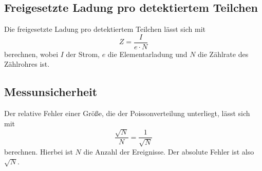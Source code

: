 \subsection{Freigesetzte Ladung pro detektiertem Teilchen}
Die freigesetzte Ladung pro detektiertem Teilchen lässt sich mit
\begin{equation}\label{eq:Z}
    Z = \frac{I}{e \cdot N}
\end{equation}
berechnen, wobei $I$ der Strom, $e$ die Elementarladung und $N$ die Zählrate des Zählrohres ist.
\subsection{Messunsicherheit}
\label{sec:Messunsicherheit}
Der relative Fehler einer Größe, die der Poissonverteilung unterliegt, lässt sich mit
\begin{equation}
    \frac{\sqrt{N}}{N} = \frac{1}{\sqrt{N}}
\end{equation}
berechnen. Hierbei ist $N$ die Anzahl der Ereignisse. Der absolute Fehler ist also $\sqrt{N}$.
